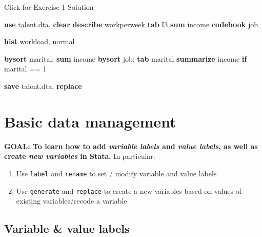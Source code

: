 \documentclass[
]{book}
\newenvironment{Shaded}{\begin{snugshade}}{\end{snugshade}}
\newcommand{\FunctionTok}[1]{\textcolor[rgb]{0.00,0.00,0.00}{#1}}
\newcommand{\KeywordTok}[1]{\textcolor[rgb]{0.13,0.29,0.53}{\textbf{#1}}}
\newcommand{\NormalTok}[1]{#1}
\providecommand{\tightlist}{%
  \setlength{\itemsep}{0pt}\setlength{\parskip}{0pt}}
\begin{document}
{Click for Exercise 1 Solution}

\begin{alert}

\begin{Shaded}
\begin{Highlighting}[]
\KeywordTok{use}\NormalTok{ talent.dta, }\KeywordTok{clear}
\KeywordTok{describe}\NormalTok{ workperweek}
\KeywordTok{tab}\NormalTok{ I3}
\KeywordTok{sum}\NormalTok{ income}
\KeywordTok{codebook}\NormalTok{ job}

\KeywordTok{hist}\NormalTok{ workload, }\FunctionTok{normal} 

\KeywordTok{bysort}\NormalTok{ marital: }\KeywordTok{sum}\NormalTok{ income}
\KeywordTok{bysort}\NormalTok{ job: }\KeywordTok{tab}\NormalTok{ marital }
\KeywordTok{summarize}\NormalTok{ income }\KeywordTok{if}\NormalTok{ marital == 1}

\KeywordTok{save}\NormalTok{ talent.dta, }\KeywordTok{replace} 
\end{Highlighting}
\end{Shaded}

\end{alert}

\hypertarget{basic-data-management}{%
\section{Basic data management}\label{basic-data-management}}

\begin{alert}

\textbf{GOAL: To learn how to add \emph{variable labels} and \emph{value labels}, as well as create \emph{new variables} in Stata.} In particular:

\begin{enumerate}
\def\labelenumi{\arabic{enumi}.}
\tightlist
\item
  Use \texttt{label} and \texttt{rename} to set / modify variable and value labels
\item
  Use \texttt{generate} and \texttt{replace} to create a new variables based on values of existing variables/recode a variable
\end{enumerate}

\end{alert}

\hypertarget{variable-value-labels}{%
\subsection{Variable \& value labels}\label{variable-value-labels}}
\end{document}
